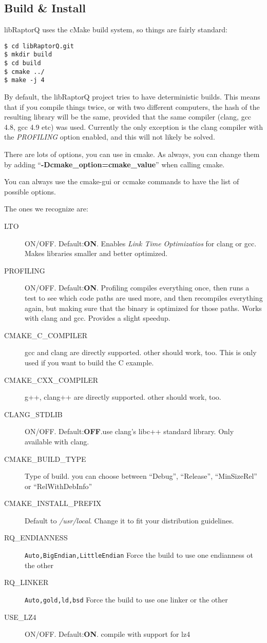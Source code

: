 \documentclass[11pt,a4paper]{refart}
\begin{document}
\subsection{Build \& Install}

libRaptorQ uses the cMake build system, so things are fairly standard:

\begin{verbatim}
$ cd libRaptorQ.git
$ mkdir build
$ cd build
$ cmake ../
$ make -j 4
\end{verbatim}

By default, the libRaptorQ project tries to have deterministic builds. This means that if you compile things twice, or with two different computers, the
hash of the resulting library will be the same, provided that the same compiler (clang, gcc 4.8, gcc 4.9 etc) was used. Currently the only exception is the clang
compiler with the \textit{PROFILING} option enabled, and this will not likely be solved.

There are lots of options, you can use in cmake. As always, you can change them by adding ``\textbf{-Dcmake\_option=cmake\_value}'' when calling cmake.

You can always use the cmake-gui or ccmake commands to have the list of possible options.

The ones we recognize are:

\begin{description}
\item[LTO] ON/OFF. Default:\textbf{ON}. Enables \textit{Link Time Optimizatios} for clang or gcc. Makes libraries smaller and better optimized.
\item[PROFILING] ON/OFF. Default:\textbf{ON}.
Profiling compiles everything once, then runs a test to see which code paths are used more, and then
recompiles everything again, but making sure that the binary is optimized for those paths. Works with clang and gcc. Provides a slight speedup.
\item[CMAKE\_C\_COMPILER] gcc and clang are directly supported. other should work, too. This is only used if you want to build the C example.
\item[CMAKE\_CXX\_COMPILER] g++, clang++ are directly supported. other should work, too.
\item[CLANG\_STDLIB] ON/OFF. Default:\textbf{OFF}.use clang's libc++ standard library. Only available with clang.
\item[CMAKE\_BUILD\_TYPE] Type of build. you can choose between ``Debug'', ``Release'', ``MinSizeRel'' or ``RelWithDebInfo''
\item[CMAKE\_INSTALL\_PREFIX] Default to \textit{/usr/local}. Change it to fit your distribution guidelines.
\item[RQ\_ENDIANNESS] \texttt{Auto,BigEndian,LittleEndian} Force the build to use one endianness ot the other
\item[RQ\_LINKER] \texttt{Auto,gold,ld,bsd} Force the build to use one linker or the other
\item[USE\_LZ4] ON/OFF. Default:\textbf{ON}. compile with support for lz4
\end{description}
\end{document}
